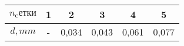\begin{tabular}{| c | c | c | c | c | c |}
    \hline
    $n_сетки$ & 1 & 2 & 3 & 4 & 5  \\
    \hline
    $d, mm$   & - & 0,034 & 0,043 & 0,061 & 0,077   \\
    \hline
\end{tabular}